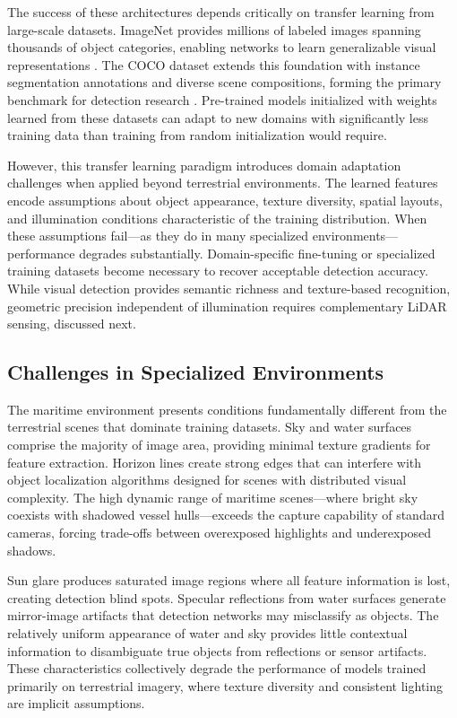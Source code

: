 \documentclass[../main.tex]{subfiles}
\begin{document}
The success of these architectures depends critically on transfer learning from large-scale datasets. ImageNet provides millions of labeled images spanning thousands of object categories, enabling networks to learn generalizable visual representations \cite{krizhevsky2017}. The COCO dataset extends this foundation with instance segmentation annotations and diverse scene compositions, forming the primary benchmark for detection research \cite{feng2021}. Pre-trained models initialized with weights learned from these datasets can adapt to new domains with significantly less training data than training from random initialization would require.

However, this transfer learning paradigm introduces domain adaptation challenges when applied beyond terrestrial environments. The learned features encode assumptions about object appearance, texture diversity, spatial layouts, and illumination conditions characteristic of the training distribution. When these assumptions fail—as they do in many specialized environments—performance degrades substantially. Domain-specific fine-tuning or specialized training datasets become necessary to recover acceptable detection accuracy. While visual detection provides semantic richness and texture-based recognition, geometric precision independent of illumination requires complementary LiDAR sensing, discussed next.

\subsection{Challenges in Specialized Environments}

The maritime environment presents conditions fundamentally different from the terrestrial scenes that dominate training datasets. Sky and water surfaces comprise the majority of image area, providing minimal texture gradients for feature extraction. Horizon lines create strong edges that can interfere with object localization algorithms designed for scenes with distributed visual complexity. The high dynamic range of maritime scenes—where bright sky coexists with shadowed vessel hulls—exceeds the capture capability of standard cameras, forcing trade-offs between overexposed highlights and underexposed shadows.

Sun glare produces saturated image regions where all feature information is lost, creating detection blind spots. Specular reflections from water surfaces generate mirror-image artifacts that detection networks may misclassify as objects. The relatively uniform appearance of water and sky provides little contextual information to disambiguate true objects from reflections or sensor artifacts. These characteristics collectively degrade the performance of models trained primarily on terrestrial imagery, where texture diversity and consistent lighting are implicit assumptions.
\end{document}
